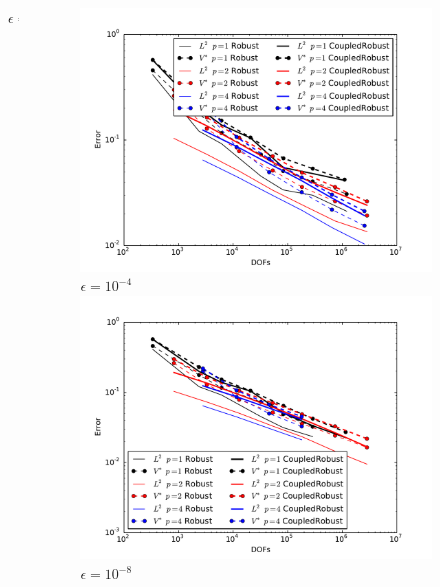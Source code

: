 \documentclass[18pt,xcolor=table]{beamer}
\let\oldfootnotesize\footnotesize
\renewcommand*{\footnotesize}{\oldfootnotesize\tiny}
\begin{document}
\begin{frame}[t]
\begin{columns}[t]
\begin{column}{0.4\textwidth}
\begin{figure}[t]
\footnotesize{$\epsilon=10^{-6}$}
\end{figure}
\end{column}
\begin{column}{0.4\textwidth}
\begin{figure}[t]
\centering
\includegraphics[width=\textwidth]{Confusion/Robustness/convergence_epsilon=1e-4.pdf}\\
\footnotesize{$\epsilon=10^{-4}$}\\
\includegraphics[width=\textwidth]{Confusion/Robustness/convergence_epsilon=1e-8.pdf}\\
\footnotesize{$\epsilon=10^{-8}$}
\end{figure}
\end{column}
\end{columns}
\end{frame}
\end{document}
